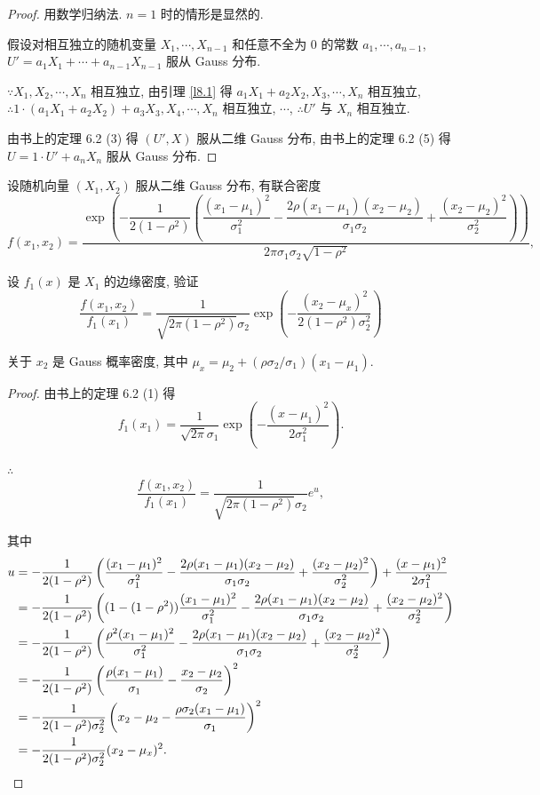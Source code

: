\documentclass[color=black,device=normal,lang=cn]{elegantnote}
\numberwithin{equation}{section}
\theoremstyle{plain}
\numberwithin{exercise}{exsection}
\begin{document}
\begin{proof}
    用数学归纳法. $n=1$ 时的情形是显然的.

    假设对相互独立的随机变量 $X_1,\cdots,X_{n-1}$ 和任意不全为 $0$ 的常数 $a_1,\cdots,a_{n-1}$, $U'=a_1X_1+\cdots+a_{n-1}X_{n-1}$ 服从 Gauss 分布.

    $\because X_1,X_2,\cdots,X_n$ 相互独立, 由引理 \ref{l8.1} 得 $a_1X_1+a_2X_2,X_3,\cdots,X_n$ 相互独立, $\therefore 1\cdot(a_1X_1+a_2X_2)+a_3X_3,X_4,\cdots,X_n$ 相互独立, $\cdots$, $\therefore U'$ 与 $X_n$ 相互独立.

    由书上的定理 6.2 (3) 得 $(U',X)$ 服从二维 Gauss 分布, 由书上的定理 6.2 (5) 得 $U=1\cdot U'+a_nX_n$ 服从 Gauss 分布.
\end{proof}
\begin{exercise}[b]%
    设随机向量 $(X_1,X_2)$ 服从二维 Gauss 分布, 有联合密度
    \[f(x_1,x_2)=\dfrac{\exp\left(-\dfrac{1}{2(1-\rho^2)}\left(\dfrac{(x_1-\mu_1)^2}{\sigma_1^2}-\dfrac{2\rho(x_1-\mu_1)(x_2-\mu_2)}{\sigma_1\sigma_2}+\dfrac{(x_2-\mu_2)^2}{\sigma_2^2}\right)\right)}{2\pi\sigma_1\sigma_2\sqrt{1-\rho^2}},\]

    设 $f_1(x)$ 是 $X_1$ 的边缘密度, 验证
    \[\dfrac{f(x_1,x_2)}{f_1(x_1)}=\dfrac{1}{\sqrt{2\pi(1-\rho^2)}\sigma_2}\exp\left(-\dfrac{(x_2-\mu_x)^2}{2(1-\rho^2)\sigma_2^2}\right)\]

    关于 $x_2$ 是 Gauss 概率密度, 其中 $\mu_x=\mu_2+(\rho\sigma_2/\sigma_1)(x_1-\mu_1)$.
\end{exercise}
\begin{proof}
    由书上的定理 6.2 (1) 得
    \[f_1(x_1)=\dfrac{1}{\sqrt{2\pi}\sigma_1}\exp\left(-\dfrac{(x-\mu_1)^2}{2\sigma_1^2}\right).\]

    $\therefore$
    \[\dfrac{f(x_1,x_2)}{f_1(x_1)}=\dfrac{1}{\sqrt{2\pi(1-\rho^2)}\sigma_2}e^u,\]

    其中
    \begin{align*}
        u & =-\dfrac{1}{2(1-\rho^2)}\left(\dfrac{(x_1-\mu_1)^2}{\sigma_1^2}-\dfrac{2\rho(x_1-\mu_1)(x_2-\mu_2)}{\sigma_1\sigma_2}+\dfrac{(x_2-\mu_2)^2}{\sigma_2^2}\right)+\dfrac{(x-\mu_1)^2}{2\sigma_1^2} \\
        & =-\dfrac{1}{2(1-\rho^2)}\left((1-(1-\rho^2))\dfrac{(x_1-\mu_1)^2}{\sigma_1^2}-\dfrac{2\rho(x_1-\mu_1)(x_2-\mu_2)}{\sigma_1\sigma_2}+\dfrac{(x_2-\mu_2)^2}{\sigma_2^2}\right) \\
        & =-\dfrac{1}{2(1-\rho^2)}\left(\dfrac{\rho^2(x_1-\mu_1)^2}{\sigma_1^2}-\dfrac{2\rho(x_1-\mu_1)(x_2-\mu_2)}{\sigma_1\sigma_2}+\dfrac{(x_2-\mu_2)^2}{\sigma_2^2}\right) \\
        & =-\dfrac{1}{2(1-\rho^2)}\left(\dfrac{\rho(x_1-\mu_1)}{\sigma_1}-\dfrac{x_2-\mu_2}{\sigma_2}\right)^2 \\
        & =-\dfrac{1}{2(1-\rho^2)\sigma_2^2}\left(x_2-\mu_2-\dfrac{\rho\sigma_2(x_1-\mu_1)}{\sigma_1}\right)^2 \\
        & =-\dfrac{1}{2(1-\rho^2)\sigma_2^2}(x_2-\mu_x)^2.\qedhere
    \end{align*}
\end{proof}
\end{document}

